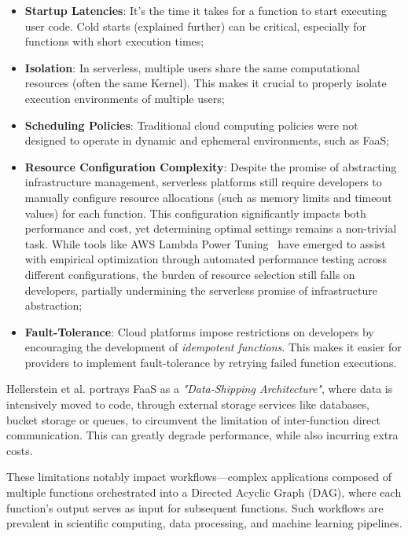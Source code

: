 \begin{itemize}
    \item \textbf{Startup Latencies}: It's the time it takes for a function to start executing user code. Cold starts (explained further) can be critical, especially for functions with short execution times;
    \item \textbf{Isolation}: In serverless, multiple users share the same computational resources (often the same Kernel). This makes it crucial to properly isolate execution environments of multiple users;
    \item \textbf{Scheduling Policies}: Traditional cloud computing policies were not designed to operate in dynamic and ephemeral environments, such as FaaS;
    \item \textbf{Resource Configuration Complexity}: Despite the promise of abstracting infrastructure management, serverless platforms still require developers to manually configure resource allocations (such as memory limits and timeout values) for each function. This configuration significantly impacts both performance and cost, yet determining optimal settings remains a non-trivial task. While tools like AWS Lambda Power Tuning~\cite{aws_lambda_power_tuning} have emerged to assist with empirical optimization through automated performance testing across different configurations, the burden of resource selection still falls on developers, partially undermining the serverless promise of infrastructure abstraction;
    \item \textbf{Fault-Tolerance}: Cloud platforms impose restrictions on developers by encouraging the development of \textit{idempotent functions}. This makes it easier for providers to implement fault-tolerance by retrying failed function executions.
\end{itemize}

Hellerstein et al. \cite{serverless_computing_drawbacks_survey_rw1} portrays FaaS as a \textit{"Data-Shipping Architecture"}, where data is intensively moved to code, through external storage services like databases, bucket storage or queues, to circumvent the limitation of inter-function direct communication. This can greatly degrade performance, while also incurring extra costs.

These limitations notably impact workflows—complex applications composed of multiple functions orchestrated into a Directed Acyclic Graph (DAG), where each function's output serves as input for subsequent functions. Such workflows are prevalent in scientific computing, data processing, and machine learning pipelines. 

